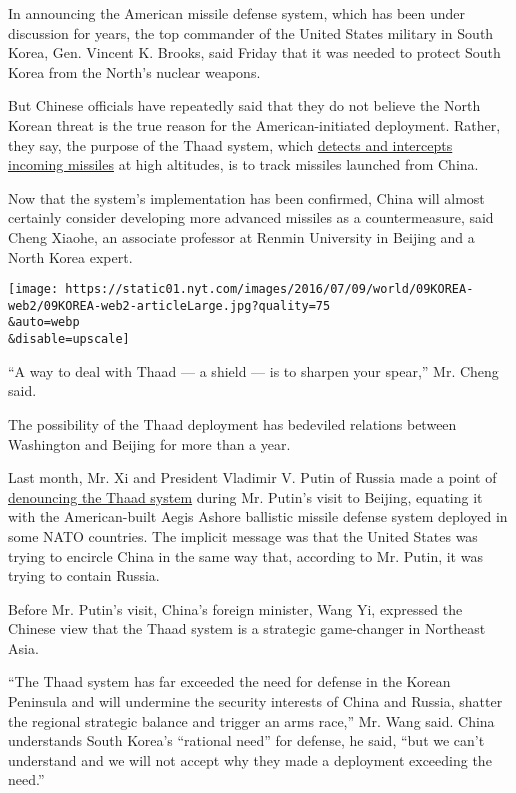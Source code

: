 In announcing the American missile defense system, which has been under
discussion for years, the top commander of the United States military in
South Korea, Gen. Vincent K. Brooks, said Friday that it was needed to
protect South Korea from the North's nuclear weapons.

But Chinese officials have repeatedly said that they do not believe the
North Korean threat is the true reason for the American-initiated
deployment. Rather, they say, the purpose of the Thaad system, which
\href{http://blogs.cfr.org/davidson/2015/03/26/korea-not-a-shrimp-anymore/}{detects
and intercepts incoming missiles} at high altitudes, is to track
missiles launched from China.

Now that the system's implementation has been confirmed, China will
almost certainly consider developing more advanced missiles as a
countermeasure, said Cheng Xiaohe, an associate professor at Renmin
University in Beijing and a North Korea expert.

\texttt{[image: https://static01.nyt.com/images/2016/07/09/world/09KOREA-web2/09KOREA-web2-articleLarge.jpg?quality=75\\\&auto=webp\\\&disable=upscale]}

``A way to deal with Thaad --- a shield --- is to sharpen your spear,''
Mr. Cheng said.

The possibility of the Thaad deployment has bedeviled relations between
Washington and Beijing for more than a year.

Last month, Mr. Xi and President Vladimir V. Putin of Russia made a
point of
\href{http://news.xinhuanet.com/english/2016-06/26/c_135466187.htm}{denouncing
the Thaad system} during Mr. Putin's visit to Beijing, equating it with
the American-built Aegis Ashore ballistic missile defense system
deployed in some NATO countries. The implicit message was that the
United States was trying to encircle China in the same way that,
according to Mr. Putin, it was trying to contain Russia.

Before Mr. Putin's visit, China's foreign minister, Wang Yi, expressed
the Chinese view that the Thaad system is a strategic game-changer in
Northeast Asia.

``The Thaad system has far exceeded the need for defense in the Korean
Peninsula and will undermine the security interests of China and Russia,
shatter the regional strategic balance and trigger an arms race,'' Mr.
Wang said. China understands South Korea's ``rational need'' for
defense, he said, ``but we can't understand and we will not accept why
they made a deployment exceeding the need.''

